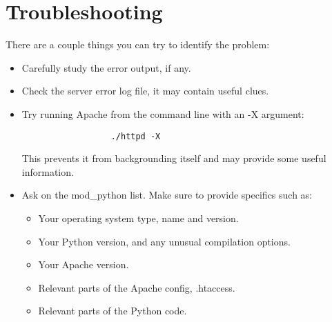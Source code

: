 \section{Troubleshooting\label{inst-trouble}}

There are a couple things you can try to identify the problem: 

\begin{itemize}

\item Carefully study the error output, if any. 

\item Check the server error log file, it may contain useful clues. 

\item Try running Apache from the command line with an -X argument: 
\begin{verbatim}
                  ./httpd -X
\end{verbatim}
This prevents it from backgrounding itself and may provide some useful information. 

\item
Ask on the mod_python list. Make sure to provide specifics such as:

\begin{itemize}

\item Your operating system type, name and version.
\item Your Python version, and any unusual compilation options.
\item Your Apache version.
\item Relevant parts of the Apache config, .htaccess.
\item Relevant parts of the Python code.

\end{itemize}

\end{itemize}